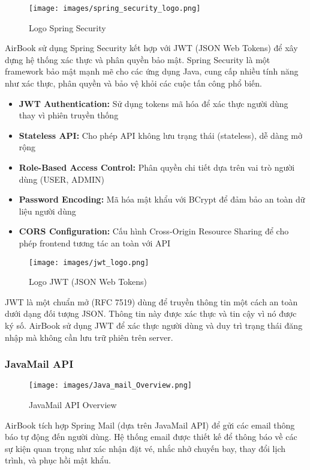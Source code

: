 \begin{figure}[H]
\centering
\texttt{[image: images/spring\_security\_logo.png]}
\caption{Logo Spring Security}
\end{figure}

AirBook sử dụng Spring Security kết hợp với JWT (JSON Web Tokens) để xây dựng hệ thống xác thực và phân quyền bảo mật. Spring Security là một framework bảo mật mạnh mẽ cho các ứng dụng Java, cung cấp nhiều tính năng như xác thực, phân quyền và bảo vệ khỏi các cuộc tấn công phổ biến.

\begin{itemize}[leftmargin=1cm]
    \item \textbf{JWT Authentication:} Sử dụng tokens mã hóa để xác thực người dùng thay vì phiên truyền thống
    \item \textbf{Stateless API:} Cho phép API không lưu trạng thái (stateless), dễ dàng mở rộng
    \item \textbf{Role-Based Access Control:} Phân quyền chi tiết dựa trên vai trò người dùng (USER, ADMIN)
    \item \textbf{Password Encoding:} Mã hóa mật khẩu với BCrypt để đảm bảo an toàn dữ liệu người dùng
    \item \textbf{CORS Configuration:} Cấu hình Cross-Origin Resource Sharing để cho phép frontend tương tác an toàn với API
\end{itemize}

\begin{figure}[H]
\centering
\texttt{[image: images/jwt\_logo.png]}
\caption{Logo JWT (JSON Web Tokens)}
\end{figure}

JWT là một chuẩn mở (RFC 7519) dùng để truyền thông tin một cách an toàn dưới dạng đối tượng JSON. Thông tin này được xác thực và tin cậy vì nó được ký số. AirBook sử dụng JWT để xác thực người dùng và duy trì trạng thái đăng nhập mà không cần lưu trữ phiên trên server.

\subsubsection{JavaMail API}

\begin{figure}[H]
\centering
\texttt{[image: images/Java\_mail\_Overview.png]}
\caption{JavaMail API Overview}
\end{figure}

AirBook tích hợp Spring Mail (dựa trên JavaMail API) để gửi các email thông báo tự động đến người dùng. Hệ thống email được thiết kế để thông báo về các sự kiện quan trọng như xác nhận đặt vé, nhắc nhở chuyến bay, thay đổi lịch trình, và phục hồi mật khẩu.

